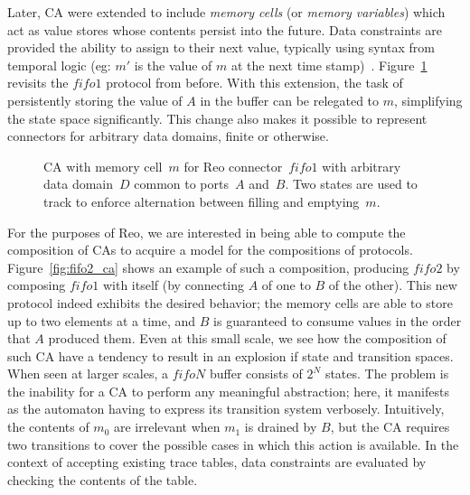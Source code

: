 Later, CA were extended to include \textit{memory cells} (or \textit{memory variables}) which act as value stores whose contents persist into the future. Data constraints are provided the ability to assign to their next value, typically using syntax from temporal logic (eg: $m'$ is the value of $m$ at the next time stamp)~\cite{arbab2007models}. Figure~\ref{fig:fifo1_ca_mem} revisits the $fifo1$ protocol from before. With this extension, the task of persistently storing the value of $A$ in the buffer can be relegated to $m$, simplifying the state space significantly. This change also makes it possible to represent connectors for arbitrary data domains, finite or otherwise.



\begin{figure}[ht]
	\centering
	\caption[CA with memory for fifo1 connector.]{CA with memory cell~$m$ for Reo connector~$fifo1$ with arbitrary data domain~$D$ common to ports~$A$ and~$B$. Two states are used to track to enforce alternation between filling and emptying~$m$.}
	\label{fig:fifo1_ca_mem}
\end{figure}


For the purposes of Reo, we are interested in being able to compute the composition of CAs to acquire a model for the compositions of protocols. Figure~\ref{fig:fifo2_ca} shows an example of such a composition, producing $fifo2$ by composing $fifo1$ with itself (by connecting $A$ of one to $B$ of the other). This new protocol indeed exhibits the desired behavior; the memory cells are able to store up to two elements at a time, and $B$ is guaranteed to consume values in the order that $A$ produced them. Even at this small scale, we see how the composition of such CA have a tendency to result in an explosion if state and transition spaces. When seen at larger scales, a $fifoN$ buffer consists of $2^N$ states. The problem is the inability for a CA to perform any meaningful abstraction; here, it manifests as the automaton having to express its transition system verbosely. Intuitively, the contents of $m_0$ are irrelevant when $m_1$ is drained by $B$, but the CA requires two transitions to cover the possible cases in which this action is available. In the context of accepting existing trace tables, data constraints are evaluated by checking the contents of the table.

